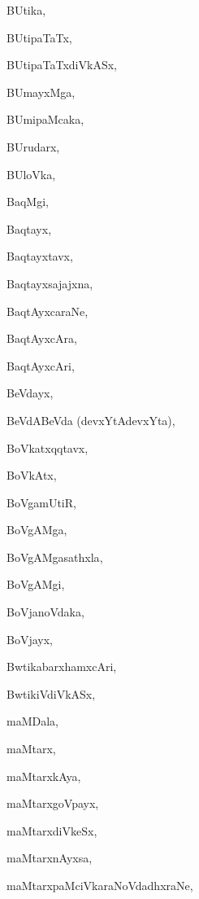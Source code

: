 \begin{multicols}{2}
{BUtika}, \pageref{BUtika}

{BUtipaTaTx}, \pageref{BUtipaTaTx}

{BUtipaTaTxdiVkASx}, \pageref{BUtipaTaTxdiVkASx}

{BUmayxMga}, \pageref{BUmayxMga}

{BUmipaMcaka}, \pageref{BUmipaMcaka}

{BUrudarx}, \pageref{BUrudarx}

{BUloVka}, \pageref{BUloVka}

{BaqMgi}, \pageref{BaqMgi}

{Baqtayx}, \pageref{Baqtayx}

{Baqtayxtavx}, \pageref{Baqtayxtavx}

{Baqtayxsajajxna}, \pageref{Baqtayxsajajxna}

{BaqtAyxcaraNe}, \pageref{BaqtAyxcaraNe}

{BaqtAyxcAra}, \pageref{BaqtAyxcAra}

{BaqtAyxcAri}, \pageref{BaqtAyxcAri}

{BeVdayx}, \pageref{BeVdayx}

{BeVdABeVda (devxYtAdevxYta)}, \pageref{BeVdABeVdadevxYtAdevxYta}

{BoVkatxqqtavx}, \pageref{BoVkatxqqtavx}

{BoVkAtx}, \pageref{BoVkAtx}

{BoVgamUtiR}, \pageref{BoVgamUtiR}

{BoVgAMga}, \pageref{BoVgAMga}

{BoVgAMgasathxla}, \pageref{BoVgAMgasathxla}

{BoVgAMgi}, \pageref{BoVgAMgi}

{BoVjanoVdaka}, \pageref{BoVjanoVdaka}

{BoVjayx}, \pageref{BoVjayx}

{BwtikabarxhamxcAri}, \pageref{BwtikabarxhamxcAri}

{BwtikiVdiVkASx}, \pageref{BwtikiVdiVkASx}

{maMDala}, \pageref{maMDala}

{maMtarx}, \pageref{maMtarx}

{maMtarxkAya}, \pageref{maMtarxkAya}

{maMtarxgoVpayx}, \pageref{maMtarxgoVpayx}

{maMtarxdiVkeSx}, \pageref{maMtarxdiVkeSx}

{maMtarxnAyxsa}, \pageref{maMtarxnAyxsa}

{maMtarxpaMciVkaraNoVdadhxraNe}, \pageref{maMtarxpaMciVkaraNoVdadhxraNe}


\end{multicols}
